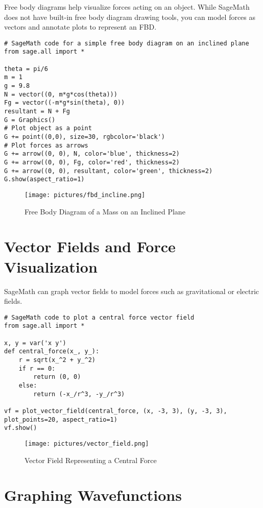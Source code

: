 \documentclass[12pt]{book}
\begin{document}
Free body diagrams help visualize forces acting on an object. While SageMath does not have built-in free body diagram drawing tools, you can model forces as vectors and annotate plots to represent an FBD.

\begin{verbatim}
# SageMath code for a simple free body diagram on an inclined plane
from sage.all import *

theta = pi/6
m = 1
g = 9.8
N = vector((0, m*g*cos(theta)))
Fg = vector((-m*g*sin(theta), 0))
resultant = N + Fg
G = Graphics()
# Plot object as a point
G += point((0,0), size=30, rgbcolor='black')
# Plot forces as arrows
G += arrow((0, 0), N, color='blue', thickness=2)
G += arrow((0, 0), Fg, color='red', thickness=2)
G += arrow((0, 0), resultant, color='green', thickness=2)
G.show(aspect_ratio=1)
\end{verbatim}

\begin{figure}[H]
  \centering
  \texttt{[image: pictures/fbd\_incline.png]}
  \caption{Free Body Diagram of a Mass on an Inclined Plane}
  \label{fig:fbd_incline}
\end{figure}

\section{Vector Fields and Force Visualization}

SageMath can graph vector fields to model forces such as gravitational or electric fields.

\begin{verbatim}
# SageMath code to plot a central force vector field
from sage.all import *

x, y = var('x y')
def central_force(x_, y_):
    r = sqrt(x_^2 + y_^2)
    if r == 0:
        return (0, 0)
    else:
        return (-x_/r^3, -y_/r^3)

vf = plot_vector_field(central_force, (x, -3, 3), (y, -3, 3), plot_points=20, aspect_ratio=1)
vf.show()
\end{verbatim}

\begin{figure}[H]
  \centering
  \texttt{[image: pictures/vector\_field.png]}
  \caption{Vector Field Representing a Central Force}
  \label{fig:vector_field}
\end{figure}

\section{Graphing Wavefunctions}
\end{document}
